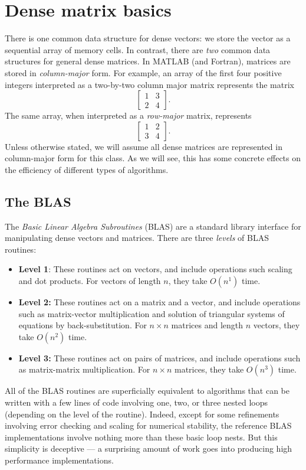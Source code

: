\documentclass[12pt, leqno]{article} %
\begin{document}
\section{Dense matrix basics}

There is one common data structure for dense vectors: we store
the vector as a sequential array of memory cells.  In contrast,
there are {\em two} common data structures for general dense matrices.
In MATLAB (and Fortran), matrices are stored in {\em column-major} form.
For example, an array of the first four positive integers interpreted
as a two-by-two column major matrix represents the matrix
\[
    \begin{bmatrix} 1 & 3 \\ 2 & 4 \end{bmatrix}.
\]
The same array, when interpreted as a {\em row-major} matrix, represents
\[
    \begin{bmatrix} 1 & 2 \\ 3 & 4 \end{bmatrix}.
\]
Unless otherwise stated, we will assume all dense matrices are represented
in column-major form for this class.  As we will see, this has some
concrete effects on the efficiency of different types of algorithms.

\subsection{The BLAS}

The {\em Basic Linear Algebra Subroutines} (BLAS) are a standard library
interface for manipulating dense vectors and matrices.  There are three
{\em levels} of BLAS routines:
\begin{itemize}
\item {\bf Level 1}:
  These routines act on vectors, and include operations
  such scaling and dot products.  For vectors of length $n$,
  they take $O(n^1)$ time.
\item {\bf Level 2:}
  These routines act on a matrix and a vector, and include operations
  such as matrix-vector multiplication and solution of triangular systems
  of equations by back-substitution.  For $n \times n$ matrices and length
  $n$ vectors, they take $O(n^2)$ time.
\item {\bf Level 3:}
  These routines act on pairs of matrices, and include operations such
  as matrix-matrix multiplication.  For $n \times n$ matrices, they
  take $O(n^3)$ time.
\end{itemize}
All of the BLAS routines are superficially equivalent to algorithms
that can be written with a few lines of code involving one, two, or
three nested loops (depending on the level of the routine).  Indeed,
except for some refinements involving error checking and scaling for
numerical stability, the reference BLAS implementations involve
nothing more than these basic loop nests.  But this simplicity is
deceptive --- a surprising amount of work goes into producing high
performance implementations.
\end{document}
